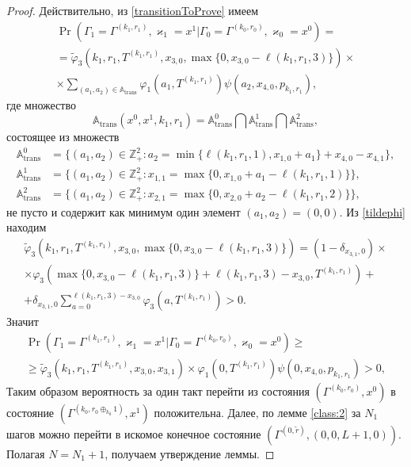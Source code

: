 \documentclass[a4paper,12pt,russian]{extarticle}
\begin{document}
\begin{proof}
Действительно, из \eqref{transitionToProve} имеем
\begin{multline*}
\Pr (\Gamma_{1}=\Gamma^{(k_1,r_1)},\varkappa_{1}=x^1 | \Gamma_{0}=\Gamma^{(k_0,r_0)},\varkappa_0=x^0)=\\
=\widetilde{\varphi}_3(k_1,r_1,T^{(k_1,r_1)},x_{3,0},\max{\{0,x_{3,0} - \ell(k_1,r_1,3)\}})\times \\
\times
\sum_{(a_1,a_2)\in {\mathbb A}_{\mathrm{trans}}}\varphi_1(a_1,T^{(k_1,r_1)})  \psi(a_2,x_{4,0}, p_{k_1,r_1}),
\end{multline*}
где множество 
\begin{equation*}
{\mathbb A}_{\mathrm{trans}}(x^0,x^1,k_1,r_1) = {\mathbb A}_{\mathrm{trans}}^0 \bigcap {\mathbb A}_{\mathrm{trans}}^1\bigcap {\mathbb A}_{\mathrm{trans}}^2,
\end{equation*}
состоящее из множеств 
\begin{align*}
{\mathbb A}_{\mathrm{trans}}^0 &= \{(a_1,a_2) \in \mathbb{Z}_+^2 \colon a_2 = \min{\{\ell(k_1,r_1,1), x_{1,0}+a_1}\} +x_{4,0}- x_{4,1}\},\\
{\mathbb A}_{\mathrm{trans}}^1 &= \{(a_1,a_2) \in \mathbb{Z}_+^2 \colon x_{1,1}=\max{\{0,x_{1,0}+a_1-\ell(k_1,r_1,1)\}}\},\\
 {\mathbb A}_{\mathrm{trans}}^2 &= \{(a_1,a_2) \in \mathbb{Z}_+^2 \colon  x_{2,1} =\max{\{0,x_{2,0}+a_2-\ell(k_1,r_1,2)\}}\},
\end{align*}
не пусто и содержит как минимум один элемент $(a_1,a_2)=(0,0)$. Из \eqref{tildephi} находим
\begin{multline*}
\widetilde{\varphi}_3(k_1,r_1,T^{(k_1,r_1)},x_{3,0},\max{\{0,x_{3,0} - \ell(k_1,r_1,3)\}}) = (1-\delta_{x_{3,1},0}) \times \\\times\varphi_3(\max{\{0,x_{3,0} - \ell(k_1,r_1,3)\}} + \ell (k_1,r_1,3) - x_{3,0},T^{(k_1,r_1)} ) 
+\\+\delta_{x_{3,1},0} \sum_{a=0}^{\ell(k_1,r_1,3)-x_{3,0}}\varphi_3 (a,T^{(k_1,r_1)})>0.
\end{multline*}
Значит
\begin{multline*}
\Pr (\Gamma_{1}=\Gamma^{(k_1,r_1)},\varkappa_{1}=x^1 | \Gamma_{0}=\Gamma^{(k_0,r_0)},\varkappa_0=x^0)\geqslant \\
\geqslant \widetilde{\varphi}_3(k_1,r_1,T^{(k_1,r_1)},x_{3,0},x_{3,1})
\times
\varphi_1(0,T^{(k_1,r_1)})  \psi(0,x_{4,0}, p_{k_1,r_1}) > 0,
\end{multline*}
Таким образом вероятность за один такт перейти из состояния $(\Gamma^{(k_0,r_0)}, x^0)$ в состояние $ (\Gamma^{(k_0,r_0\oplus_{k_0}1)}, x^1)$ положительна.
Далее, по лемме \eqref{class:2} за $N_1$ шагов можно перейти в искомое конечное состояние $(\Gamma^{(0,\tilde{r} )}, (0,0,L+1,0))$. Полагая $N=N_1+1$, получаем утверждение леммы.
\end{proof}
\end{document}
